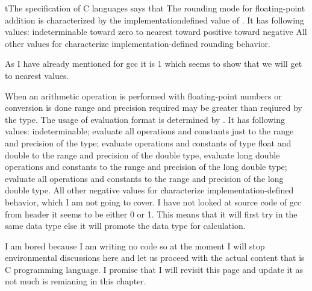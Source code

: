 tThe specification of C languages says that The rounding mode for
floating-point addition is characterized by the implementationdefined
value of . It has following values:\hfill\break
{} indeterminable\hfill\break
{} toward zero\hfill\break
{} to nearest\hfill\break
{} toward positive \infty\hfill\break
{} toward negative \infty\hfill\break
All other values for  characterize implementation-defined rounding
behavior. 

As I have already mentioned for gcc it is 1 which seems to show that
we will get to nearest values.

When an arithmetic operation is performed with floating-point numbers
or conversion is done range and precision required may be greater than
reqiured by the type. The usage of evaluation format is determined by
. It has following values:\hfill\break
{} indeterminable;\hfill\break
{} evaluate all operations and constants just to the range and
precision of the type;\hfill\break
{} evaluate operations and constants of type float and double to the
range and precision of the double type, evaluate long double
operations and constants to the range and precision of the long double
type;\hfill\break
{} evaluate all operations and constants to the range and precision of the
long double type.\hfill\break
All other negative values for  characterize
implementation-defined behavior, which I am not going to cover. I have
not looked at source code of gcc from header it seems to be either 0
or 1. This means that it will first try in the same data type else it
will promote the data type for calculation.

I am bored because I am writing no code so at the moment I will stop
environmental discussions here and let us proceed with the actual
content that is C programming language. I promise that I will revisit
this page and update it as not much is remianing in this chapter.
